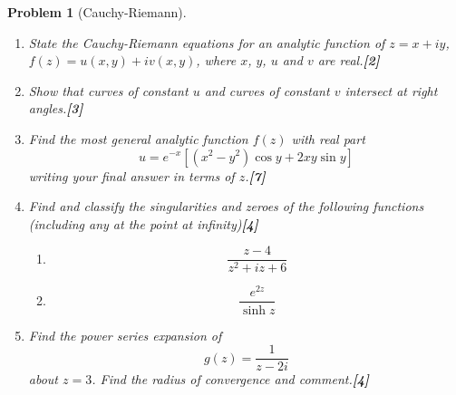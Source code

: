 \documentclass[a4paper]{article}
\theoremstyle{new}
\newtheorem{qns}{Problem}[section]
\begin{document}
\newpage
\begin{qns}[Cauchy-Riemann]\leavevmode
\begin{enumerate}[label=(\alph*)]
\item State the Cauchy-Riemann equations for an analytic function of $z = x + iy$, $f(z) = u(x, y) + iv(x, y)$, where $x$, $y$, $u$ and $v$ are real.\hfill\textbf{[2]}
\item Show that curves of constant $u$ and curves of constant $v$ intersect at right angles.\hfill\textbf{[3]}
\item Find the most general analytic function $f(z)$ with real part 
$$u=e^{-x}[(x^2-y^2)\cos y+2xy\sin y]$$
writing your final answer in terms of $z$.\hfill\textbf{[7]}
\item Find and classify the singularities and zeroes of the following functions (including any at the point at infinity)\hfill\textbf{[4]}
\begin{enumerate}[label=(\roman*)]
    \item $$\frac{z-4}{z^2+iz+6}$$
    \item $$\frac{e^{2z}}{\sinh z}$$
\end{enumerate}
\item Find the power series expansion of
$$g(z)=\frac{1}{z-2i}$$
about $z = 3$. Find the radius of convergence and comment.\hfill\textbf{[4]}
\end{enumerate}
\end{qns}
\end{document}
